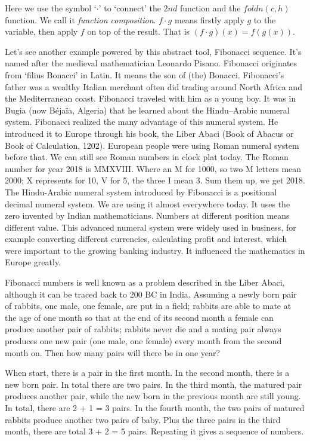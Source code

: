 \documentclass[UTF8]{article}
\begin{document}
Here we use the symbol `$\cdot$' to `connect' the $2nd$ function and the $foldn(c, h)$ function. We call it {\em function composition}. $f\cdot g$ means firstly apply $g$ to the variable, then apply $f$ on top of the result. That is $(f\cdot g)(x) = f(g(x))$.

Let's see another example powered by this abstract tool, Fibonacci sequence. It's named after the medieval mathematician Leonardo Pisano. Fibonacci originates from `filius Bonacci' in Latin. It means the son of (the) Bonacci. Fibonacci's father was a wealthy Italian merchant
 often did trading around North Africa and the Mediterranean coast. Fibonacci traveled with him as a young boy. It was in Bugia (now Béjaïa, Algeria) that he learned about the Hindu–Arabic numeral system. Fibonacci realized the many advantage of this numeral system. He introduced it to Europe through his book, the Liber Abaci (Book of Abacus or Book of Calculation, 1202). European people were using Roman numeral system before that. We can still see Roman numbers in clock plat today. The Roman number for year 2018 is MMXVIII. Where an M for 1000, so two M letters mean 2000; X represents for 10, V for 5, the three I mean 3. Sum them up, we get 2018. The Hindu-Arabic numeral system introduced by Fibonacci is a positional decimal numeral system. We are using it almost everywhere today. It uses the zero invented by Indian mathematicians. Numbers at different position means different value. This advanced numeral system were widely used in business, for example converting different currencies, calculating profit and interest, which were important to the growing banking industry. It influenced the mathematics in Europe greatly.

Fibonacci numbers is well known as a problem described in the Liber Abaci, although it can be traced back to 200 BC in India. Assuming a newly born pair of rabbits, one male, one female, are put in a field; rabbits are able to mate at the age of one month so that at the end of its second month a female can produce another pair of rabbits; rabbits never die and a mating pair always produces one new pair (one male, one female) every month from the second month on. Then how many pairs will there be in one year?

When start, there is a pair in the first month. In the second month, there is a new born pair. In total there are two pairs. In the third month, the matured pair produces another pair, while the new born in the previous month are still young. In total, there are 2 + 1 = 3 pairs. In the fourth month, the two pairs of matured rabbits produce another two pairs of baby. Plus the three pairs in the third month, there are total 3 + 2 = 5 pairs. Repeating it gives a sequence of numbers.
\end{document}
